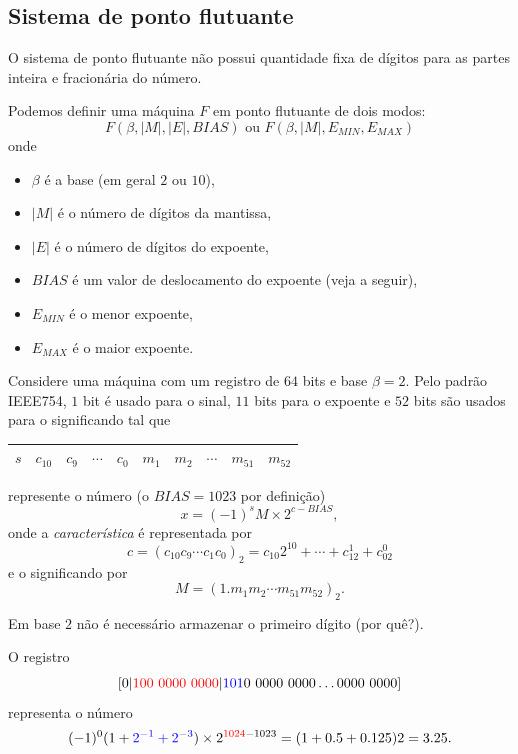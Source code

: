 \subsection{Sistema de ponto flutuante}

O sistema de ponto flutuante não possui quantidade fixa de dígitos para as partes inteira e fracionária do número. 

Podemos definir uma máquina $F$ em ponto flutuante de dois modos:
$$ F(\beta,|M|,|E|,BIAS) \text{ ou } F(\beta,|M|,E_{MIN},E_{MAX})$$
onde
\begin{itemize}
 \item $\beta$ é a base (em geral $2$ ou $10$),
 \item $|M|$ é o número de dígitos da mantissa,
 \item $|E|$ é o número de dígitos do expoente,
 \item $BIAS$ é um valor de deslocamento do expoente (veja a seguir),
 \item $E_{MIN}$ é o menor expoente,
 \item $E_{MAX}$ é o maior expoente.
\end{itemize}


Considere uma máquina com um registro de $64$ bits e base $\beta=2$. Pelo padrão IEEE754, $1$ bit é usado para o sinal, $11$ bits para o expoente e $52$ bits são usados para o significando tal que 
\begin{center}
  \begin{tabular}{|c|c|c|c|c|c|c|c|c|c|}\hline
    $s$ & $c_{10}$ & $c_{9}$ & $\cdots$ & $c_{0}$ & $m_1$ & $m_2$ & $\cdots$ & $m_{51}$ & $m_{52}$\\\hline
  \end{tabular}  
\end{center}
represente o número (o $BIAS=1023$ por definição)
$$ x=(-1)^{s}M \times 2^{c-BIAS},$$
onde a \emph{característica} é representada por
$$c=(c_{10}c_9\cdots c_1c_0)_2=c_{10}2^{10}+\cdots+c_12^1+c_02^0 $$
e o significando por
$$M=(1.m_1m_2\cdots m_{51}m_{52})_2.$$

\begin{obs}
  Em base $2$ não é necessário armazenar o primeiro dígito (por quê?).  
\end{obs}

\begin{ex}
O registro
$$
[0|{\color{red}{100~0000~0000}} |{\color{blue}{101}}0~0000~0000\ldots 0000~0000]
$$
representa o número
$$
(-1)^0(1+{\color{blue}{2^{-1}+2^{-3}}})\times  2^{{\color{red}{1024}}-1023}=(1+0.5+0.125)2=3.25.
$$  
\end{ex}

